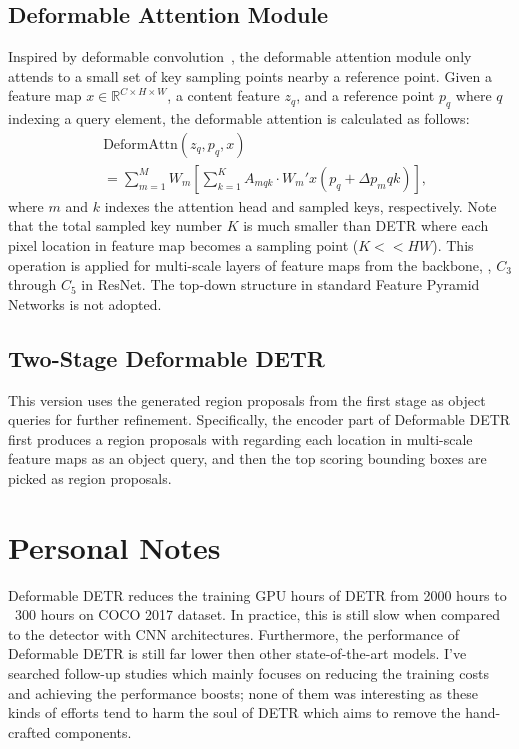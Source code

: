 \documentclass[10pt,twocolumn,letterpaper]{article}
\begin{document}
\subsection{Deformable Attention Module}
Inspired by deformable convolution~\cite{deformablecnn}, the deformable attention module only attends to a small set of key sampling points nearby a reference point.
Given a feature map $x \in \mathbb{R}^{C \times H \times W}$, a content feature $z_q$, and a reference point $p_q$ where $q$ indexing a query element, the deformable attention is calculated as follows:
\begin{equation}
\begin{split}
    & \textrm{DeformAttn}(z_q, p_q, x) \\
    & = \sum^{M}_{m=1}W_m[\sum^{K}_{k=1}A_{mqk} \cdot W_m'x(p_q + \Delta  p_mqk)],
\end{split}
\end{equation}
where $m$ and $k$ indexes the attention head and sampled keys, respectively.
Note that the total sampled key number $K$ is much smaller than DETR where each pixel location in feature map becomes a sampling point ($K << HW$).
This operation is applied for multi-scale layers of feature maps from the backbone, \eg, $C_3$ through $C_5$ in ResNet.
The top-down structure in standard Feature Pyramid Networks is not adopted.

\subsection{Two-Stage Deformable DETR}
This version uses the generated region proposals from the first stage as object queries for further refinement.
Specifically, the encoder part of Deformable DETR first produces a region proposals with regarding each location in multi-scale feature maps as an object query, and then the top scoring bounding boxes are picked as region proposals.




\section{Personal Notes}

Deformable DETR reduces the training GPU hours of DETR from 2000 hours to ~300 hours on COCO 2017 dataset.
In practice, this is still slow when compared to the detector with CNN architectures.
Furthermore, the performance of Deformable DETR is still far lower then other state-of-the-art models.
I've searched follow-up studies which mainly focuses on reducing the training costs and achieving the performance boosts; none of them was interesting as these kinds of efforts tend to harm the soul of DETR which aims to remove the hand-crafted components.
\end{document}
